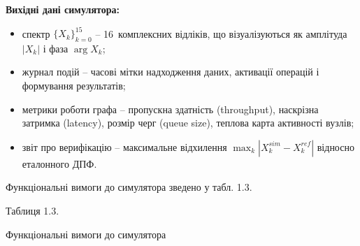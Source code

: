\documentclass[
]{article}
\begin{document}
\textbf{Вихідні дані симулятора:}

\begin{itemize}
\item
  спектр \(\{ X_{k}\}_{k = 0}^{15}\) -- 16~комплексних відліків, що
  візуалізуються як амплітуда \(|X_{k}|\) і фаза \(\arg X_{k}\);
\item
  журнал подій -- часові мітки надходження даних, активації операцій і
  формування результатів;
\item
  метрики роботи графа -- пропускна здатність (throughput), наскрізна
  затримка (latency), розмір черг (queue size), теплова карта активності
  вузлів;
\item
  звіт про верифікацію -- максимальне відхилення
  \(\max_{k}|X_{k}^{sim} - X_{k}^{ref}|\) відносно еталонного ДПФ.
\end{itemize}

Функціональні вимоги до симулятора зведено у табл. 1.3.

Таблиця 1.3.

Функціональні вимоги до симулятора
\end{document}
